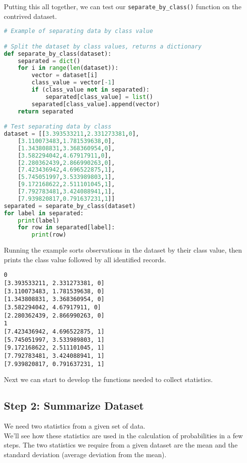 \documentclass[12pt]{article}
\begin{document}
Putting this all together, we can test our \verb|separate_by_class()| function on the contrived dataset.

\newpage

\begin{lstlisting}[language=python]
# Example of separating data by class value

# Split the dataset by class values, returns a dictionary
def separate_by_class(dataset):
	separated = dict()
	for i in range(len(dataset)):
		vector = dataset[i]
		class_value = vector[-1]
		if (class_value not in separated):
			separated[class_value] = list()
		separated[class_value].append(vector)
	return separated

# Test separating data by class
dataset = [[3.393533211,2.331273381,0],
	[3.110073483,1.781539638,0],
	[1.343808831,3.368360954,0],
	[3.582294042,4.67917911,0],
	[2.280362439,2.866990263,0],
	[7.423436942,4.696522875,1],
	[5.745051997,3.533989803,1],
	[9.172168622,2.511101045,1],
	[7.792783481,3.424088941,1],
	[7.939820817,0.791637231,1]]
separated = separate_by_class(dataset)
for label in separated:
	print(label)
	for row in separated[label]:
		print(row)

\end{lstlisting}

Running the example sorts observations in the dataset by their class value, then prints the class value followed by all identified records.\\

\begin{lstlisting}
0
[3.393533211, 2.331273381, 0]
[3.110073483, 1.781539638, 0]
[1.343808831, 3.368360954, 0]
[3.582294042, 4.67917911, 0]
[2.280362439, 2.866990263, 0]
1
[7.423436942, 4.696522875, 1]
[5.745051997, 3.533989803, 1]
[9.172168622, 2.511101045, 1]
[7.792783481, 3.424088941, 1]
[7.939820817, 0.791637231, 1]

\end{lstlisting}

Next we can start to develop the functions needed to collect statistics.

\newpage

\subsection{Step 2: Summarize Dataset}

We need two statistics from a given set of data.\\

We'll see how these statistics are used in the calculation of probabilities in a few steps. The two statistics we require from a given dataset are the mean and the standard deviation (average deviation from the mean).\\
\end{document}
